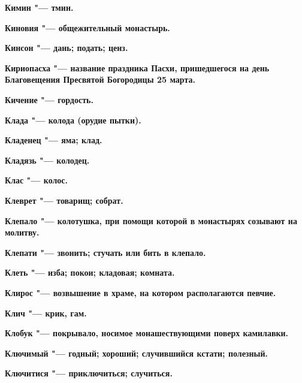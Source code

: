 \begin{mymulticols}{2}
\bfseries Кимин\normalfont{} "--- тмин. 




\bfseries Киновия\normalfont{} "--- общежительный монастырь. 




\bfseries Кинсон\normalfont{} "--- дань; подать; ценз. 




\bfseries Кириопасха\normalfont{} "--- название праздника Пасхи, пришедшегося на день Благовещения Пресвятой Богородицы 25 марта. 




\bfseries Кичение\normalfont{} "--- гордость. 




\bfseries Клада\normalfont{} "--- колода (орудие пытки). 




\bfseries Кладенец\normalfont{} "--- яма; клад. 




\bfseries Кладязь\normalfont{} "--- колодец. 




\bfseries Клас\normalfont{} "--- колос. 




\bfseries Клеврет\normalfont{} "--- товарищ; собрат. 




\bfseries Клепало\normalfont{} "--- колотушка, при помощи которой в монастырях созывают на молитву. 




\bfseries Клепати\normalfont{} "--- звонить; стучать или бить в клепало. 




\bfseries Клеть\normalfont{} "--- изба; покои; кладовая; комната. 




\bfseries Клирос\normalfont{} "--- возвышение в храме, на котором располагаются певчие. 




\bfseries Клич\normalfont{} "--- крик, гам. 




\bfseries Клобук\normalfont{} "--- покрывало, носимое монашествующими поверх камилавки. 




\bfseries Ключимый\normalfont{} "--- годный; хороший; случившийся кстати; полезный. 




\bfseries Ключитися\normalfont{} "--- приключиться; случиться. 





\end{mymulticols}
